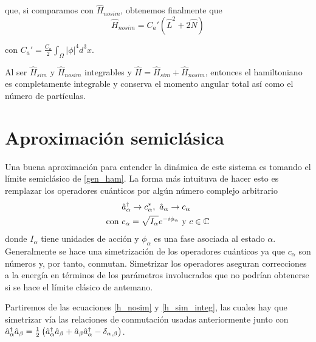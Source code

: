 que, si comparamos con $\hat{H}_{nosim}$, obtenemos finalmente que 
\begin{equation}
\hat{H}_{nosim} = C_a'\left( \hat{L}^2 + 2\hat{N} \right)
\label{h_nosim_integ}
\end{equation}

con $C_a' = \frac{C_a}{2}\int_{\Omega}|\phi|^4d^3x$.

Al ser $\hat{H}_{sim}$ y $\hat{H}_{nosim}$ integrables y $\hat{H} = \hat{H}_{sim} + \hat{H}_{nosim}$, entonces el hamiltoniano es completamente integrable y conserva el momento angular total así como el número de partículas. 



\section{Aproximación semiclásica}
Una buena aproximación para entender la dinámica de este sistema es tomando el límite semiclásico de \ref{gen_ham}. La forma más intuituva de hacer esto es remplazar los operadores cuánticos por algún número complejo arbitrario 
\begin{equation}
\begin{split}
& \hat{a}_{\alpha}^{\dagger} \to c_\alpha^*, \ \hat{a}_{\alpha} \to c_\alpha \\ 
\text{con } & c_\alpha = \sqrt{I_\alpha}e^{-i\phi_\alpha} \text{ y } c \in \mathbb{C}
\end{split}
\label{heisen_rels}
\end{equation}
donde $I_\alpha$ tiene unidades de acción y $\phi_\alpha$ es una fase asociada al estado $\alpha$. Generalmente \cite{benet,graefe2007} se hace una simetrización de los operadores cuánticos ya que $c_\alpha$ son números y, por tanto, conmutan. Simetrizar los operadores aseguran correcciones a la energía en términos de los parámetros involucrados que no podrían obtenerse si se hace el límite clásico de antemano.

Partiremos de las ecuaciones \ref{h_nosim} y \ref{h_sim_integ}, las cuales hay que simetrizar vía las relaciones de conmutación usadas anteriormente junto con $\hat{a}_{\alpha}^{\dagger}\hat{a}_{\beta} = \frac{1}{2} \left( \hat{a}_{\alpha}^{\dagger}\hat{a}_{\beta} + \hat{a}_{\beta}\hat{a}_{\alpha}^{\dagger} - \delta_{\alpha,\beta} \right)$.  


